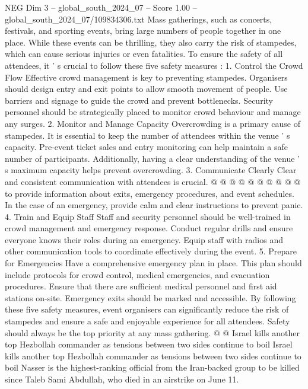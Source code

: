\begin{textsample}{NEG Dim 3 – global\_south\_2024\_07 – Score 1.00 – global\_south\_2024\_07/109834306.txt}  \label{ex:f3_neg_147}
Mass gatherings, such as concerts, festivals, and sporting events, bring large numbers of people together in one place.
While these events can be thrilling, they also carry the risk of stampedes, which can cause serious injuries or even fatalities.
To ensure the safety of all attendees, it ' s crucial to follow these five safety measures : 1.
Control the Crowd Flow Effective crowd management is key to preventing stampedes.
Organisers should design entry and exit points to allow smooth movement of people.
Use barriers and signage to guide the crowd and prevent bottlenecks.
Security personnel should be strategically placed to monitor crowd behaviour and manage any surges. 2.
Monitor and Manage Capacity Overcrowding is a primary cause of stampedes.
It is essential to keep the number of attendees within the venue ' s capacity.
Pre-event ticket sales and entry monitoring can help maintain a safe number of participants.
Additionally, having a clear understanding of the venue ' s maximum capacity helps prevent overcrowding. 3.
Communicate Clearly Clear and consistent communication with attendees is crucial. @ @ @ @ @ @ @ @ @ @ to provide information about exits, emergency procedures, and event schedules.
In the case of an emergency, provide calm and clear instructions to prevent panic. 4.
Train and Equip Staff Staff and security personnel should be well-trained in crowd management and emergency response.
Conduct regular drills and ensure everyone knows their roles during an emergency.
Equip staff with radios and other communication tools to coordinate effectively during the event. 5.
Prepare for Emergencies Have a comprehensive emergency plan in place.
This plan should include protocols for crowd control, medical emergencies, and evacuation procedures.
Ensure that there are sufficient medical personnel and first aid stations on-site.
Emergency exits should be marked and accessible.
By following these five safety measures, event organisers can significantly reduce the risk of stampedes and ensure a safe and enjoyable experience for all attendees.
Safety should always be the top priority at any mass gathering. @ @ Israel kills another top Hezbollah commander as tensions between two sides continue to boil Israel kills another top Hezbollah commander as tensions between two sides continue to boil Nasser is the highest-ranking official from the Iran-backed group to be killed since Taleb Sami Abdullah, who died in an airstrike on June 11.

\end{textsample}
